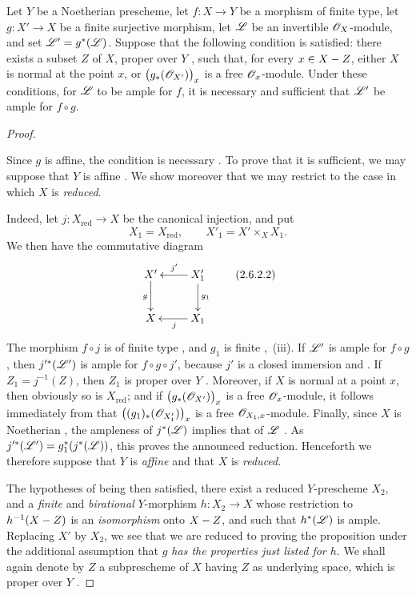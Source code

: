 \begin{proposition}[2.6.2]
\label{III.2.6.2}
Let $Y$ be a Noetherian prescheme, let $f:X\to Y$ be a morphism of
finite type, let $g:X'\to X$ be a finite surjective morphism, let
$\mathscr{L}$ be an invertible $\mathscr{O}_X$-module, and set $\mathscr{L}'=g^*(\mathscr{L})$.
Suppose that the following condition is satisfied: there exists a subset $Z$ of $X$, proper over $Y$
, such that, for every $x\in X- Z$, either $X$ is
normal at the point $x$, or $\bigl(g_*(\mathscr{O}_{X'})\bigr)_x$
is a free $\mathscr{O}_x$-module.
Under these conditions, for $\mathscr{L}$ to be ample for $f$, it is necessary and sufficient that $\mathscr{L}'$ be ample for
$f\circ g$.
\end{proposition}

\begin{proof}
\begin{env}[2.6.2.1]
\label{III.2.6.2.1}
Since $g$ is affine, the condition is necessary .
To prove that it is sufficient, we may suppose that $Y$ is affine
.
We show moreover that we may restrict to the case in which $X$ is
\emph{reduced}.

Indeed, let $j:X_{\mathrm{red}}\to X$ be the canonical injection, and put
\[
  X_1=X_{\mathrm{red}},
  \qquad
  X'_1=X'\times_X X_1.
\]
We then have the commutative diagram
\[
  \xymatrix{
    X'\ar[d]_g &
    X'_1\ar[l]_{j'}\ar[d]^{g_1}\\
    X &
    X_1\ar[l]^{j}
  }
  \label{III.2.6.2.2}\tag{2.6.2.2}
\]
The morphism $f\circ j$ is of finite type , and
$g_1$ is finite ,~(iii).
If $\mathscr{L}'$ is ample for $f\circ g$, then
$j'^*(\mathscr{L}')$ is ample for $f\circ g\circ j'$, because $j'$ is a
closed immersion  and .
If $Z_1=j^{-1}(Z)$, then $Z_1$ is proper over $Y$
.
Moreover, if $X$ is normal at a point $x$, then obviously so is $X_{\mathrm{red}}$; and if
$\bigl(g_*(\mathscr{O}_{X'})\bigr)_x$ is a free $\mathscr{O}_x$-module,
it follows immediately from  that $\bigl((g_1)_*(\mathscr{O}_{X'_1})\bigr)_x$
is a free $\mathscr{O}_{X_1,x}$-module.
Finally, since $X$ is Noetherian , the ampleness of
$j^*(\mathscr{L})$ implies that of $\mathscr{L}$ .
As $j'^*(\mathscr{L}')=g_1^*(j^*(\mathscr{L}))$,
this proves the announced reduction.
Henceforth we therefore suppose that $Y$ is \emph{affine} and that $X$ is \emph{reduced}.
\end{env}

The hypotheses of  being then satisfied, there exist a reduced $Y$-prescheme $X_2$, and a \emph{finite} and \emph{birational}
$Y$-morphism $h:X_2\to X$
whose restriction to $h^{-1}(X- Z)$ is an \emph{isomorphism} onto $X- Z$, and
such that $h^*(\mathscr{L})$ is ample.
Replacing $X'$ by $X_2$, we see that we are reduced to proving the proposition under
the additional assumption that \emph{$g$ has the properties just listed for
$h$}.
We shall again denote by $Z$ a subprescheme of $X$ having $Z$ as
underlying space, which is proper over $Y$ .


\end{proof}
